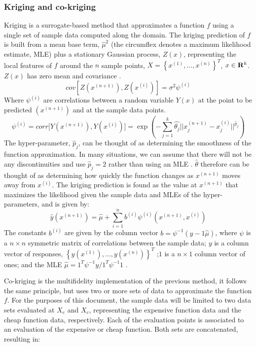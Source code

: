 \subsubsection{Kriging and co-kriging}
\label{subsubsec:kriging}
Kriging is a surrogate-based method that approximates a function $f$ using a single set of sample data computed along the domain.  The kriging prediction of $f$ is built from a mean base term, $\hat{\mu}^2$ (the circumflex denotes a maximum likelihood estimate, MLE) plus a stationary Gaussian process, $Z(x)$, representing the local features of $f$ around the $n$ sample points, $X=\left \{x^{(1)},...,x^{(n)}\right \}^T$, $x\in\mathbf{R}^k$. $Z(x)$ has zero mean and covariance \cite{Forrester2007}.
\begin{equation}
    cov[Z(x^{(n+1)}),Z(x^{(i)})]=\sigma^2\psi^{(i)}
\end{equation}
Where $\psi^{(i)}$ are correlations between a random variable $Y(x)$ at the point to be predicted $(x^{(n+1)})$ and at the sample data points.
\begin{equation}
    \psi^{(i)}=corr \lbrack Y(x^{(n+1)}),Y(x^{(i)}) \rbrack=\exp{\left(-\sum_{j=1}^{k}\hat{\theta_j}||x_{j}^{(n+1)}-x_{j}^{(i)}||^{\hat{p}_j} \right)}
\end{equation}
The hyper-parameter, $\hat{p}_j$, can be thought of as determining the smoothness of the function approximation. In many situations, we can assume that there will not be any discontinuities and use $\hat{p}_j=2$ rather than using an MLE \cite{Forrester2007}. $\hat{\theta}$ therefore can be thought of as determining how quickly the function changes as $x^{(n+1)}$ moves away from $x^{(i)}$.  The kriging prediction is found as the value at $x^{(n+1)}$ that maximizes the likelihood given the sample data and MLEs of the hyper-parameters, and is given by:
\begin{equation}
    \hat{y}\left(x^{(n+1)}\right)=\hat{\mu}+\sum_{i=1}^{n}b^{(i)}\psi^{(i)}\left(x^{(n+1)},x^{(i)}\right)
\end{equation}
The constants $b^{(i)}$ are given by the column vector $b=\psi^{-1}(y-1\hat{\mu})$, where $\psi$ is a $n\times n$ symmetric matrix of correlations between the sample data; $y$ is a column vector of responses, $\left \{y(x^{(1)}),...,y(x^{(n)})\right \}^T$ ;$1$ is a $n\times1$ column vector of ones; and the MLE $\hat{\mu}=1^T\psi^{-1}y/1^T\psi^{-1}1$ \cite{Forrester2007}. \par
Co-kriging is the multifidelity implementation of the previous method, it follows the same principle, but uses two or more sets of data to approximate the function $f$. For the purposes of this document, the sample data will be limited to two data sets evaluated at $X_e$ and $X_c$, representing the expensive function data and the cheap function data, respectively. Each of the evaluation points is associated to an evaluation of the expensive or cheap function. Both sets are concatenated, resulting in: 
